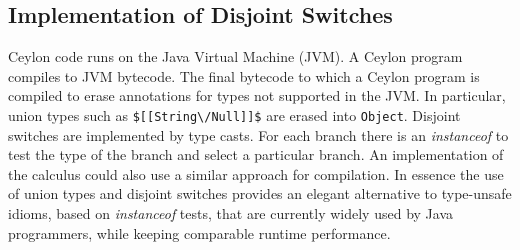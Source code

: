  \subsection{Implementation of Disjoint Switches}
 Ceylon code runs on the Java Virtual Machine (JVM).
A Ceylon program compiles to JVM bytecode.
The final bytecode to which a Ceylon program is compiled to erase
annotations for types not supported in the JVM. 
In particular, union types such as 
\lstinline{$[[String\/Null]]$} are erased into \lstinline{Object}.
Disjoint switches are implemented by type casts. For each branch there is
an \emph{instanceof} to test the type of the branch and select 
a particular branch. An implementation of the \name calculus 
could also use a similar approach for compilation.
In essence the use of union types and disjoint switches
provides an elegant alternative to type-unsafe idioms,
based on \emph{instanceof} tests, that are currently widely
used by Java programmers, while keeping comparable runtime performance.

\begin{comment}
 On the contrary, our operational semantics has access to type information
 and selects a particular branch depending upon the available type information
 as shown in \Cref{sec:union:os}.
 \bruno{Look at a simple program with disjoint switches and see how that is compiled.
   I presume that it is compile by erasing the union/intersection types and then
   using instanceof tests instead of the disjoint switches. You can probably
   compile a ceylon file and then try to open the class file in Eclipse or some
   other IDE to see what kind of (bytecode) is generated.
 }
 \baber{Done. I verified from the bytecode. It uses instanceof of tests and
 selects a branch where the test matches. It actually also has a default
 case in bytecode at the end to handle type error if the switch is not
 exhaustive. This is in contradiction to Ceylon specification of
 exhaustive checking in switch construct in source code.}
\end{comment}







